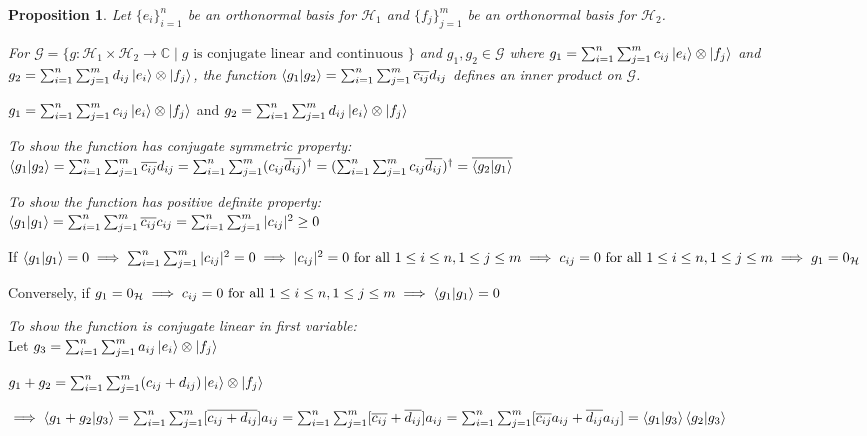 \documentclass[12pt,twoside,fleqn]{report}
\makeatletter
\theoremstyle{thmstyle}
\renewenvironment{proof}[1][\proofname]{\par
\pushQED{\qed}%
\normalfont \topsep6\p@\@plus6\p@\relax
\trivlist
\item[\hskip\labelsep\itshape#1\@addpunct{.}]\mbox{}\par\nobreak\ignorespaces
}{%
    \popQED\endtrivlist\@endpefalse
    }
\newtheorem{prop}{Proposition}[chapter]
\makeatother
\begin{document}
\begin{prop}
    Let $\{ e_i \}_{i=1}^n$ be an orthonormal basis for $\mathcal{H}_1$ and $\{ f_j \}_{j=1}^m$ be an orthonormal basis for $\mathcal{H}_2$.

    For $\mathcal{G} = \{ g: \mathcal{H}_1 \times \mathcal{H}_2 \to \mathbb{C} \; | \; g \text{ is conjugate linear and continuous } \}$ and $g_1, g_2 \in \mathcal{G}$ where $g_1 = \sum_{i=1}^n \sum_{j=1}^m c_{ij} \ket{e_i} \otimes \ket{f_j}$ and $g_2 = \sum_{i=1}^n \sum_{j=1}^m d_{ij} \ket{e_i} \otimes \ket{f_j}$, the function $\braket{g_1 | g_2} = \sum_{i=1}^n \sum_{j=1}^m \overline{c_{ij}} d_{ij}$ defines an inner product on $\mathcal{G}$.

\end{prop}
\begin{proof}
    $g_1 = \sum_{i=1}^n \sum_{j=1}^m c_{ij} \ket{e_i} \otimes \ket{f_j}$ and $g_2 = \sum_{i=1}^n \sum_{j=1}^m d_{ij} \ket{e_i} \otimes \ket{f_j}$

    \emph{To show the function has conjugate symmetric property:} \\
    $\braket{g_1 | g_2} = \sum_{i=1}^n \sum_{j=1}^m \overline{c_{ij}} d_{ij} = \sum_{i=1}^n \sum_{j=1}^m (c_{ij} \overline{d_{ij}})^\dagger = (\sum_{i=1}^n \sum_{j=1}^m c_{ij} \overline{d_{ij}} )^\dagger = \overline{\braket{g_2|g_1}} $

    \emph{To show the function has positive definite property:} \\
     $\braket{g_1|g_1} = \sum_{i=1}^n \sum_{j=1}^m \overline{c_{ij}} c_{ij} = \sum_{i=1}^n \sum_{j=1}^m |c_{ij}|^2 \geq 0$

    If $\braket{g_1|g_1} = 0 \implies \sum_{i=1}^n \sum_{j=1}^m |c_{ij}|^2 = 0 \implies |c_{ij}|^2 = 0 \text{ for all } 1 \leq i \leq n, 1 \leq j \leq m \implies c_{ij} = 0  \text{ for all } 1 \leq i \leq n, 1 \leq j \leq m \implies g_1 = 0_\mathcal{H}$

    Conversely, if $g_1 = 0_\mathcal{H} \implies c_{ij} = 0 \text{ for all } 1 \leq i \leq n, 1 \leq j \leq m \implies \braket{g_1|g_1} = 0$

    \emph{To show the function is conjugate linear in first variable:} \\

    Let $g_3 = \sum_{i = 1}^n \sum_{j=1}^m a_{ij} \ket{e_i} \otimes \ket{f_j}$

    $g_1 + g_2 = \sum_{i=1}^n \sum_{j=1}^m (c_{ij} + d_{ij}) \ket{e_i} \otimes \ket{f_j}$

    $\implies \braket{g_1 + g_2 | g_3} = \sum_{i=1}^n \sum_{j=1}^m [\overline{c_{ij} + d_{ij}}]a_{ij} = \sum_{i=1}^n \sum_{j=1}^m [\overline{c_{ij}} + \overline{d_{ij}}] a_{ij} = \sum_{i=1}^n \sum_{j=1}^m [\overline{c_{ij}} a_{ij}+ \overline{d_{ij}} a_{ij}] = \braket{g_1|g_3} \braket{g_2|g_3}$


\end{proof}
\end{document}
